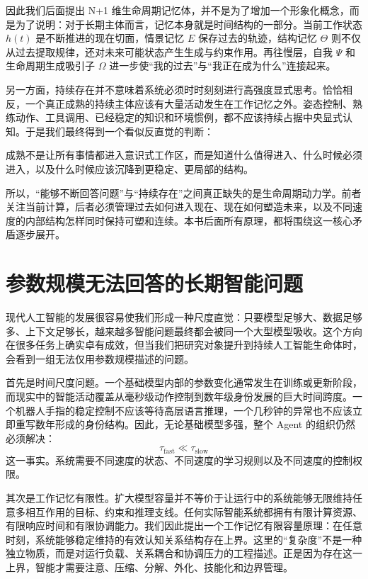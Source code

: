 因此我们后面提出 N+1 维生命周期记忆体，并不是为了增加一个形象化概念，而是为了说明：对于长期主体而言，记忆本身就是时间结构的一部分。当前工作状态 $h(t)$ 是不断推进的现在切面，情景记忆 $E$ 保存过去的轨迹，结构记忆 $\Theta$ 则不仅从过去提取规律，还对未来可能状态产生生成与约束作用。再往慢层，自我 $\Psi$ 和生命周期生成吸引子 $\Omega$ 进一步使“我的过去”与“我正在成为什么”连接起来。

另一方面，持续存在并不意味着系统必须时时刻刻进行高强度显式思考。恰恰相反，一个真正成熟的持续主体应该有大量活动发生在工作记忆之外。姿态控制、熟练动作、工具调用、已经稳定的知识和环境惯例，都不应该持续占据中央显式认知。于是我们最终得到一个看似反直觉的判断：
\begin{statementbox}
\centering
{}
\end{statementbox}
成熟不是让所有事情都进入意识式工作区，而是知道什么值得进入、什么时候必须进入，以及什么时候应该沉降到更稳定、更局部的结构。

所以，“能够不断回答问题”与“持续存在”之间真正缺失的是生命周期动力学。前者关注当前计算，后者必须管理过去如何进入现在、现在如何塑造未来，以及不同速度的内部结构怎样同时保持可塑和连续。本书后面所有原理，都将围绕这一核心矛盾逐步展开。

\section{参数规模无法回答的长期智能问题}

现代人工智能的发展很容易使我们形成一种尺度直觉：只要模型足够大、数据足够多、上下文足够长，越来越多智能问题最终都会被同一个大型模型吸收。这个方向在很多任务上确实卓有成效，但当我们把研究对象提升到持续人工智能生命体时，会看到一组无法仅用参数规模描述的问题。

首先是时间尺度问题。一个基础模型内部的参数变化通常发生在训练或更新阶段，而现实中的智能活动覆盖从毫秒级动作控制到数年级身份发展的巨大时间跨度。一个机器人手指的稳定控制不应该等待高层语言推理，一个几秒钟的异常也不应该立即重写数年形成的身份结构。因此，无论基础模型多强，整个 Agent 的组织仍然必须解决：
\[
\tau_{\text{fast}}
\ll
\tau_{\text{slow}}
\]
这一事实。系统需要不同速度的状态、不同速度的学习规则以及不同速度的控制权限。

其次是工作记忆有限性。扩大模型容量并不等价于让运行中的系统能够无限维持任意多相互作用的目标、约束和推理支线。任何实际智能系统都拥有有限计算资源、有限响应时间和有限协调能力。我们因此提出一个工作记忆有限容量原理：在任意时刻，系统能够稳定维持的有效认知关系结构存在上界。这里的“复杂度”不是一种独立物质，而是对运行负载、关系耦合和协调压力的工程描述。正是因为存在这一上界，智能才需要注意、压缩、分解、外化、技能化和边界管理。

